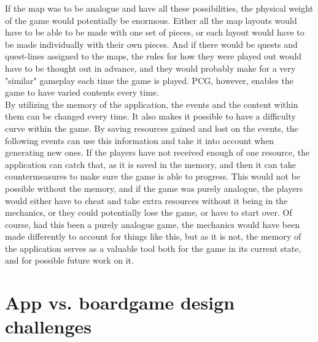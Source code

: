 If the map was to be analogue and have all these possibilities, the physical weight of the game would potentially be enormous. Either all the map layouts would have to be able to be made with one set of pieces, or each layout would have to be made individually with their own pieces. And if there would be quests and quest-lines assigned to the maps, the rules for how they were played out would have to be thought out in advance, and they would probably make for a very "similar" gameplay each time the game is played. PCG, however, enables the game to have varied contents every time.\\

By utilizing the memory of the application, the events and the content within them can be changed every time. It also makes it possible to have a difficulty curve within the game. By saving resources gained and lost on the events, the following events can use this information and take it into account when generating new ones. If the players have not received enough of one resource, the application can catch that, as it is saved in the memory, and then it can take countermeasures to make sure the game is able to progress. This would not be possible without the memory, and if the game was purely analogue, the players would either have to cheat and take extra resources without it being in the mechanics, or they could potentially lose the game, or have to start over. Of course, had this been a purely analogue game, the mechanics would have been made differently to account for things like this, but as it is not, the memory of the application serves as a valuable tool both for the game in its current state, and for possible future work on it.


\section{App vs. boardgame design challenges}
